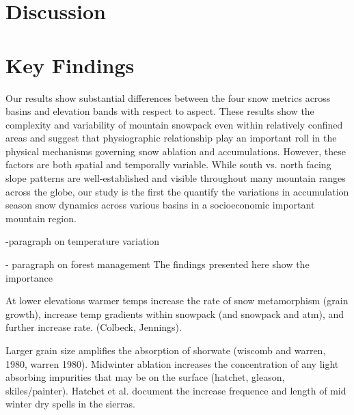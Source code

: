 \hypertarget{ch2-discussion}{\section{Discussion}\label{ch2-discussion}}
\hypertarget{ch2-discussion-1}{\section{Key Findings}\label{ch2-discussion-1}}


Our results show substantial differences between the four snow metrics across basins and elevation bands with respect to aspect. These results show the complexity and variability of mountain snowpack even within relatively confined areas and suggest that physiographic relationship play an important roll in the physical mechanisms governing snow ablation and accumulations. However, these factors are both spatial and temporally variable. While south vs. north facing slope patterns are well-established and visible throughout many mountain ranges across the globe, our study is the first the quantify the variations in accumulation season snow dynamics across various basins in a socioeconomic important mountain region.


-paragraph on temperature variation \citep{kapnickCausesRecentChanges2012}

- paragraph on forest management The findings presented here show the importance 


At lower elevations warmer temps increase the rate of snow metamorphism (grain growth), increase temp gradients within snowpack (and snowpack and atm), and further increase rate. (Colbeck, Jennings). 

Larger grain size amplifies the absorption of shorwate (wiscomb and warren, 1980, warren 1980). Midwinter ablation increases the concentration of any light absorbing impurities that may be on the surface (hatchet, gleason, skiles/painter). Hatchet et al. document the increase frequence and length of mid winter dry spells in the sierras. 

